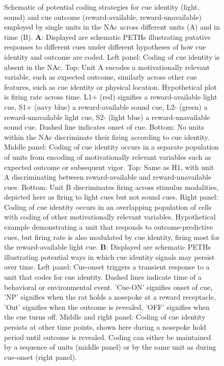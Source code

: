 \documentclass[11pt]{article}
\newcommand{\bsf}[1]{\textbf{#1}}
\begin{document}
\begin{figure}[ht!]
\caption{Schematic of potential coding strategies for cue identity (light, sound) and cue outcome (reward-available, reward-unavailable) employed by single units in the NAc across different units (A) and in time (B). \bsf{A}: Displayed are schematic PETHs illustrating putative responses to different cues under different hypotheses of how cue identity and outcome are coded. Left panel: Coding of cue identity is absent in the NAc. Top: Unit A encodes a motivationally relevant variable, such as expected outcome, similarly across other cue features, such as cue identity or physical location. Hypothetical plot is firing rate across time. L1+ (red) signifies a reward-available light cue, S1+ (navy blue) a reward-available sound cue, L2- (green) a reward-unavailable light cue, S2- (light blue) a reward-unavailable sound cue. Dashed line indicates onset of cue. Bottom: No units within the NAc discriminate their firing according to cue identity. Middle panel: Coding of cue identity occurs in a separate population of units from encoding of motivationally relevant variables such as expected outcome or subsequent vigor. Top: Same as H1, with unit A discriminating between reward-available and reward-unavailable cues. Bottom: Unit B discriminates firing across stimulus modalities, depicted here as firing to light cues but not sound cues. Right panel: Coding of cue identity occurs in an overlapping population of cells with coding of other motivationally relevant variables. Hypothetical example demonstrating a unit that responds to outcome-predictive cues, but firing rate is also modulated by cue identity, firing most for the reward-available light cue. \bsf{B}: Displayed are schematic PETHs illustrating potential ways in which cue identity signals may persist over time. Left panel: Cue-onset triggers a transient response to a unit that codes for cue identity. Dashed lines indicate time of a behavioral or environmental event. 'Cue-ON' signifies onset of cue, 'NP' signifies when the rat holds a nosepoke at a reward receptacle, 'Out' signifies when the outcome is revealed, 'OFF' signifies when the cue turns off. Middle and right panel: Coding of cue identity persists at other time points, shown here during a nosepoke hold period until outcome is revealed. Coding can either be maintained by a sequence of units (middle panel) or by the same unit as during cue-onset (right panel).}
\label{fig:schematic}
\end{figure} \clearpage
\end{document}

